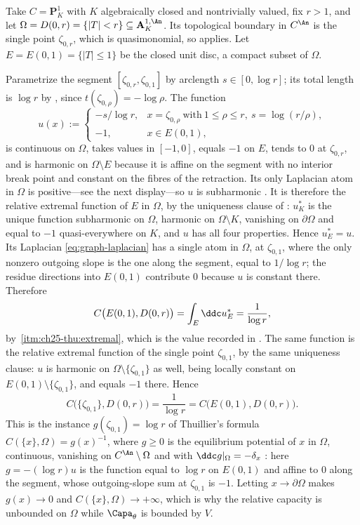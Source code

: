 \begin{example}
\label{ex:ch25-thuillier-disc}
Take $C=\mathbf P^1_K$ with $K$ algebraically closed and nontrivially
valued, fix $r>1$, and let
$\Omega=D(0,r)=\{|T|<r\}\subseteq\mathbf A^{1,\An}_K$.  Its topological
boundary in $C^{\An}$ is the single point $\zeta_{0,r}$, which is
quasimonomial, so  applies.  Let
$E=E(0,1)=\{|T|\leq1\}$ be the closed unit disc, a compact subset of
$\Omega$.

Parametrize the segment $[\zeta_{0,r},\zeta_{0,1}]$ by arclength
$s\in[0,\log r]$; its total length is $\log r$ by
, since $t(\zeta_{0,\rho})=-\log\rho$.  The
function
\[
 u(x):=
 \begin{cases}
  -s/\log r,&x=\zeta_{0,\rho}\ \text{with}\ 1\leq\rho\leq r,\ s=\log(r/\rho),\\
  -1,&x\in E(0,1),
 \end{cases}
\]
is continuous on $\Omega$, takes values in $[-1,0]$, equals $-1$ on
$E$, tends to $0$ at $\zeta_{0,r}$, and is harmonic on
$\Omega\setminus E$ because it is affine on the segment with no interior
break point and constant on the fibres of the retraction.  Its only
Laplacian atom in $\Omega$ is positive---see the next display---so $u$ is
subharmonic \cite[Th\'eor\`eme~3.4.12]{Thu05}.  It is therefore the relative
extremal function of $E$ in $\Omega$, by the uniqueness clause of
\cite[Th\'eor\`eme~3.6.13]{Thu05}: $u^*_K$ is the unique function
subharmonic on $\Omega$, harmonic on $\Omega\setminus K$, vanishing on
$\partial\Omega$ and equal to $-1$ quasi-everywhere on $K$, and $u$
has all four properties.  Hence $u^*_E=u$.  Its Laplacian
\eqref{eq:graph-laplacian} has a single atom in $\Omega$, at
$\zeta_{0,1}$, where the only nonzero outgoing slope is the one along the
segment, equal to $1/\log r$; the residue directions into $E(0,1)$
contribute $0$ because $u$ is constant there.  Therefore
\begin{equation}
\label{eq:ch25-thuillier-disc}
 C\bigl(E(0,1),D(0,r)\bigr)=\int_E\ddc u^*_E=\frac1{\log r},
\end{equation}
by \,\cref{itm:ch25-thu:extremal}, which is
the value recorded in \cite[Remarque~3.6.12]{Thu05}.  The same function is
the relative extremal function of the single point $\zeta_{0,1}$, by the
same uniqueness clause: $u$ is harmonic on
$\Omega\setminus\{\zeta_{0,1}\}$ as well, being locally constant on
$E(0,1)\setminus\{\zeta_{0,1}\}$, and equals $-1$ there.  Hence
\[
 C\bigl(\{\zeta_{0,1}\},D(0,r)\bigr)=\frac1{\log r}
 =C\bigl(E(0,1),D(0,r)\bigr).
\]
This is the instance $g(\zeta_{0,1})=\log r$ of Thuillier's formula
$C(\{x\},\Omega)=g(x)^{-1}$, where $g\geq0$ is the equilibrium
potential of $x$ in $\Omega$, continuous, vanishing on
$C^{\An}\setminus\Omega$ and with $\ddc g|_\Omega=-\delta_x$
\cite[Lemme~3.6.28]{Thu05}: here $g=-(\log r)u$ is the function
equal to $\log r$ on $E(0,1)$ and affine to $0$ along the segment, whose
outgoing-slope sum at $\zeta_{0,1}$ is $-1$.  Letting $x\to\partial\Omega$
makes $g(x)\to0$ and $C(\{x\},\Omega)\to+\infty$, which is why the
relative capacity is unbounded on $\Omega$ while $\Capa_\theta$ is
bounded by $V$.


\end{example}
